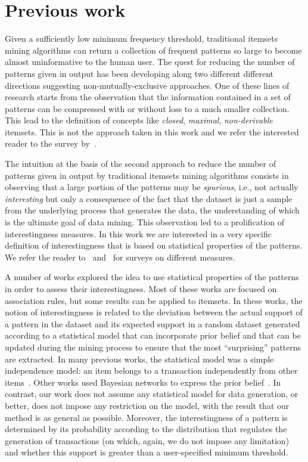 \section{Previous work}\label{sec:prevwork}
Given a sufficiently low minimum frequency threshold, traditional itemsets
mining algorithms can return a collection of frequent patterns so large to
become almost uninformative to the human user. The quest for reducing the number
of patterns given in output has been developing along two different different
directions suggesting non-mutually-exclusive approaches. One of these lines of
research starts from the observation that the information contained in a
set of patterns can be compressed with or without loss to a much smaller
collection. This lead to the definition of concepts like \emph{closed},
\emph{maximal}, \emph{non-derivable} itemsets. This is not the approach taken in
this work and we refer the interested reader to the survey by~\citet{CaldersRB06}.

The intuition at the basis of the second approach to reduce the number of
patterns given in output by traditional itemsets mining algorithms consists in
observing that a large portion of the patterns may be \emph{spurious}, i.e., not
actually \emph{interesting} but only a consequence of the fact that the dataset
is just a sample from the underlying process that generates the data, the
understanding of which is the ultimate goal of data mining. This observation led
to a prolification of interestingness measures. In this work we are interested
in a very specific definition of interestingness that is based on statistical
properties of the patterns. We refer the reader to~\citep[Sect.~3]{HanCXY07}
and~\citep{GengH06} for surveys on different measures.

A number of works explored the idea to use statistical properties of the
patterns in order to assess their interestingness. Most of these works are
focused on association rules, but some results can be applied to itemsets. In
these works, the notion of interestingness is related to the deviation between
the actual support of a pattern in the dataset and its expected support in a
random dataset generated according to a statistical model that can incorporate
prior belief and that can be updated during the mining process to ensure that
the most ``surprising'' patterns are extracted. In many previous works, the
statistical model was a simple independence model: an item belongs to a
transaction independently from other
items~\citep{SilversteinBM98,MegiddoS98,DuMouchelP01,BoltonHA02,GionisMMT07,Hamalainen10,KirschMAPUV12}.
Other works used Bayesian networks to express the prior
belief~\citep{JaroszewiczSS09}. In contrast, our work does not assume any
statistical model for data generation, or better, does not impose any
restriction on the model, with the result that our method is as general as
possible. Moreover, the interestingness of a pattern is determined by its
probability according to the distribution that regulates the generation of
transactions (on which, again, we do not impose any limitation) and whether this
support is greater than a user-specified minimum threshold.  

